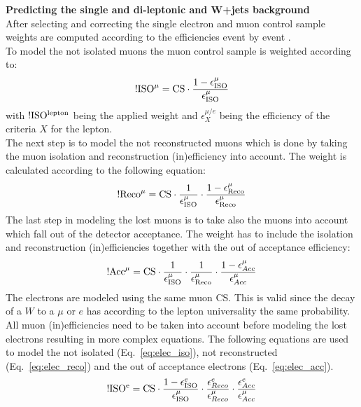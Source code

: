 {\bf Predicting the single and di-leptonic \ttbar and W+jets background}\\
After selecting and correcting the single electron and muon control sample weights are computed according to the efficiencies event by event .\\
To model the not isolated muons the muon control sample is weighted according to:
\begin{equation}
  !\text{ISO}^{\mu} = {\rm CS}\cdot \frac{1-\epsilon_{\rm ISO}^{\mu}}{\epsilon_{\rm ISO}^{\mu}} 
  \label{eq:isolation_muon}
\end{equation}
with $\rm !ISO^{lepton}$ being the applied weight and $\epsilon_{X}^{\mu/e}$ being the efficiency of the criteria $X$ for the lepton.\\
The next step is to model the not reconstructed muons which is done by taking the muon isolation and reconstruction (in)efficiency into account. The weight is calculated according to the following equation:
\begin{equation}
  {!\text{Reco}^{\mu}} = {\rm CS}\cdot \frac{1}{\epsilon_{\rm ISO}^{\mu}} \cdot \frac{1-\epsilon_{\rm Reco}^{\mu}}{\epsilon_{\rm Reco}^{\mu}}
  \label{eq:reconstruction_muon}
\end{equation}
The last step in modeling the lost muons is to take also the muons into account which fall out of the detector acceptance. The weight has to include the isolation and reconstruction (in)efficiencies together with the out of acceptance efficiency:
\begin{equation}
  { !\text{Acc}^{\mu}} = {\rm CS}\cdot \frac{1}{\epsilon_{\rm ISO}^{\mu}}\cdot \frac{1}{\epsilon_{\rm Reco}^{\mu}} \cdot \frac{1-\epsilon^{\mu}_{Acc}}{\epsilon^{\mu}_{Acc}}
  \label{eq:acceptance_muon}
\end{equation}
The electrons are modeled using the same muon CS. This is valid since the decay of a $W$ to a $\mu$ or $e$ has according to the lepton universality the same probability.
All muon (in)efficiencies need to be taken into account before modeling the lost electrons resulting in more complex equations. The following equations are used to model the not isolated (Eq.~\ref{eq:elec_iso}), not reconstructed (Eq.~\ref{eq:elec_reco}) and the out of acceptance electrons (Eq.~\ref{eq:elec_acc}). 
\begin{equation}
  {\rm !ISO^{e}} = {\rm CS}\cdot \frac{1-\epsilon_{\rm ISO}^{e}}{\epsilon_{\rm ISO}^{\mu}} \cdot \frac{\epsilon^{e}_{Reco}}{\epsilon^{\mu}_{Reco}} \cdot \frac{\epsilon^{e}_{Acc}}{\epsilon^{\mu}_{Acc}}
  \label{eq:elec_iso}
\end{equation}

